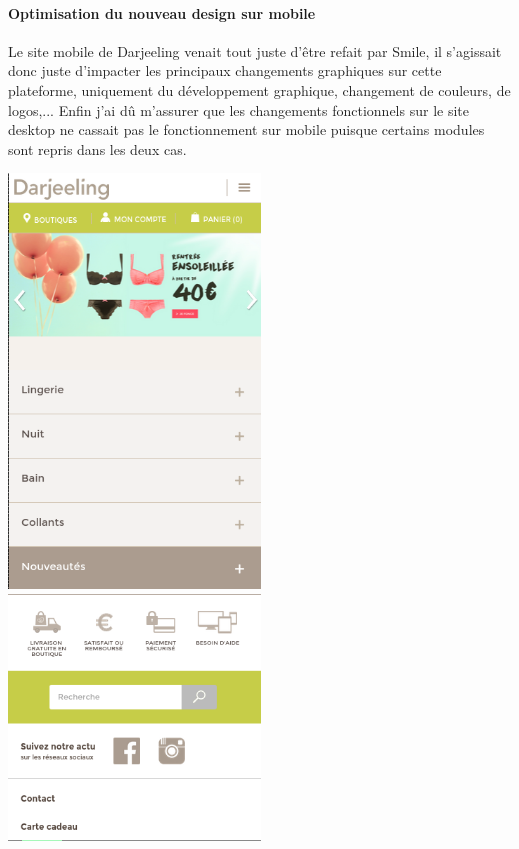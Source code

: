 \documentclass[a4paper,11pt,twoside]{report}
\begin{document}
	\paragraph*{Optimisation du nouveau design sur mobile}
	Le site mobile de Darjeeling venait tout juste d'être refait par Smile, il s'agissait donc juste d'impacter les principaux changements graphiques sur cette plateforme, uniquement du développement graphique, changement de couleurs, de logos,... Enfin j'ai dû m'assurer que les changements fonctionnels sur le site desktop ne cassait pas le fonctionnement sur mobile puisque certains modules sont repris dans les deux cas. 
	\begin{center}
	  \includegraphics[width=190pt]{images/darjeeling_mobile_home.png} 
	  \includegraphics[width=190pt]{images/darjeeling_mobile_footer.png} 
	  \label{darjeeling_mobile}
	\end{center}
\end{document}
